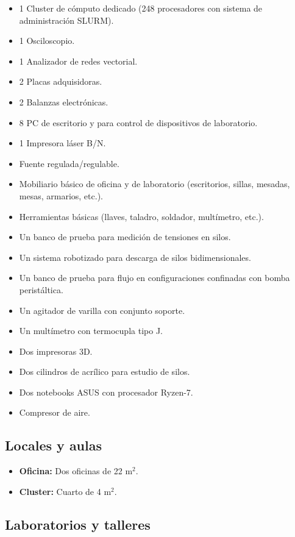 \documentclass[a4paper,11pt,twoside,final,titlepage,onecolumn,openright]{report}
\begin{document}
\begin{itemize}
 \item 1 Cluster de cómputo dedicado (248 procesadores con sistema de administración SLURM).
 \item 1 Osciloscopio.
 \item 1 Analizador de redes vectorial.
 \item 2 Placas adquisidoras.
 \item 2 Balanzas electrónicas.
 \item 8 PC de escritorio y para control de dispositivos de laboratorio.
 \item 1 Impresora láser B/N.
 \item Fuente regulada/regulable.
 \item Mobiliario básico de oficina y de laboratorio (escritorios, sillas, mesadas, mesas, armarios, etc.).
 \item Herramientas básicas (llaves, taladro, soldador, multímetro, etc.).
 \item Un banco de prueba para medición de tensiones en silos.
 \item Un sistema robotizado para descarga de silos bidimensionales.
 \item Un banco de prueba para flujo en configuraciones confinadas con bomba peristáltica.
 \item Un agitador de varilla con conjunto soporte.
 \item Un multímetro con termocupla tipo J.
\item Dos impresoras 3D.
\item Dos cilindros de acrílico para estudio de silos.
\item Dos notebooks ASUS con procesador Ryzen-7.
\item Compresor de aire.
\end{itemize}


\subsection{Locales y aulas}

\begin{itemize}
 \item {\bf Oficina:} Dos oficinas de 22 m$^2$. 
 \item {\bf Cluster:} Cuarto de 4 m$^2$. 
\end{itemize}

\subsection{Laboratorios y talleres}
\end{document}
